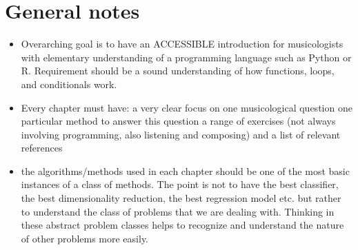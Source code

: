 \documentclass[letterpaper,10pt,english]{sphinxmanual}
\begin{document}
\section{General notes}
\label{\detokenize{0_intro:general-notes}}\begin{itemize}
\item {} 
Overarching goal is to have an ACCESSIBLE introduction for musicologists with elementary understanding of a programming language such as Python or R. Requirement should be a sound understanding of how functions, loops, and conditionals work.

\item {} 
Every chapter must have:
\textendash{} a very clear focus on one musicological question
\textendash{} one particular method to answer this question
\textendash{} a range of exercises (not always involving programming, also listening and composing)
\textendash{} and a list of relevant references

\item {} 
the algorithms/methods used in each chapter should be one of the most basic instances of a class of methods. The point is not to have the best classifier, the best dimensionality reduction, the best regression model etc. but rather to understand the class of problems that we are dealing with. Thinking in these abstract problem classes helps to recognize and understand the nature of other problems more easily.

\end{itemize}
\end{document}
